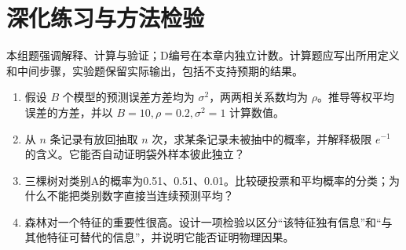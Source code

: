 \section*{深化练习与方法检验}
本组题强调解释、计算与验证；D编号在本章内独立计数。计算题应写出所用定义和中间步骤，实验题保留实际输出，包括不支持预期的结果。
\begin{enumerate}[label=D\arabic*.]
\item 假设 $B$ 个模型的预测误差方差均为 $\sigma^2$，两两相关系数均为 $\rho$。推导等权平均误差的方差，并以 $B=10,\rho=0.2,\sigma^2=1$ 计算数值。
\item 从 $n$ 条记录有放回抽取 $n$ 次，求某条记录未被抽中的概率，并解释极限 $e^{-1}$ 的含义。它能否自动证明袋外样本彼此独立？
\item 三棵树对类别A的概率为0.51、0.51、0.01。比较硬投票和平均概率的分类；为什么不能把类别数字直接当连续预测平均？
\item 森林对一个特征的重要性很高。设计一项检验以区分“该特征独有信息”和“与其他特征可替代的信息”，并说明它能否证明物理因果。
\end{enumerate}
